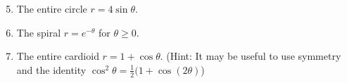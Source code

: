 \documentclass[12pt]{article}
\newif\ifans
\begin{document}

\begin{enumerate}
\setcounter{enumi}{4}

\item The entire circle $r=4\sin{\theta}$.

\ifans{\fbox{$4\pi$}} \fi

\item The spiral $r=e^{-\theta}$ for $\theta \geq 0$.

\ifans{\fbox{$\sqrt{2}$}} \fi

\item The entire cardioid $r=1+\cos{\theta}$. (Hint: It may be useful to use symmetry and the identity $\cos^2{\theta}=\frac{1}{2}(1+\cos{(2\theta)}$)

\ifans{\fbox{8; Detailed Solution: \textcolor{blue}{\href{http://www.math.drexel.edu/classes/Calculus/resources/Math122HW/Solutions/122_19_Polar_Calc_07.pdf}{Here}}}} \fi

\end{enumerate}

\end{document}
